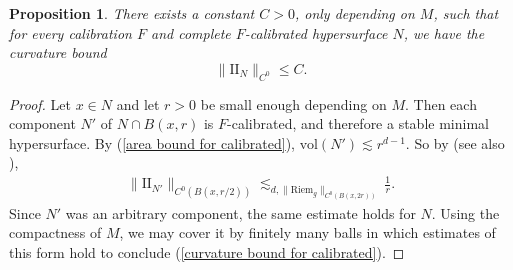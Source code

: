 \documentclass[reqno,11pt]{amsart}
\newcommand{\NN}{\mathbf{N}}
\newcommand{\RR}{\mathbf{R}}
\newcommand{\Sph}{\mathbf S}
\newcommand{\Two}{\mathrm{I\!I}}
\newcommand{\vol}{\mathrm{vol}}
\newcommand{\Riem}{\mathrm{Riem}}
\newtheorem{lemma}[theorem]{Lemma}
\newtheorem{proposition}[theorem]{Proposition}
\theoremstyle{definition}
\numberwithin{equation}{section}
\begin{document}
\begin{proposition}
There exists a constant $C > 0$, only depending on $M$, such that for every calibration $F$ and complete $F$-calibrated hypersurface $N$, we have the curvature bound
\begin{equation}\label{curvature bound for calibrated}
\|\Two_N\|_{C^0} \leq C.
\end{equation}
\end{proposition}
\begin{proof}
Let $x \in N$ and let $r > 0$ be small enough depending on $M$.
Then each component $N'$ of $N \cap B(x, r)$ is $F$-calibrated, and therefore a stable minimal hypersurface.
By (\ref{area bound for calibrated}), $\vol(N') \lesssim r^{d - 1}$.
So by \cite[pg785, Corollary 1]{Schoen81} (see also \cite[Chapter 2, \S\S4-5]{colding2011course}),
\begin{align*}
\|\Two_{N'}\|_{C^0(B(x, r/2))} \lesssim_{d, \|\Riem_g\|_{C^0(B(x, 2r))}} \frac{1}{r}.
\end{align*}
Since $N'$ was an arbitrary component, the same estimate holds for $N$.
Using the compactness of $M$, we may cover it by finitely many balls in which estimates of this form hold to conclude (\ref{curvature bound for calibrated}).
\end{proof}


\end{document}
